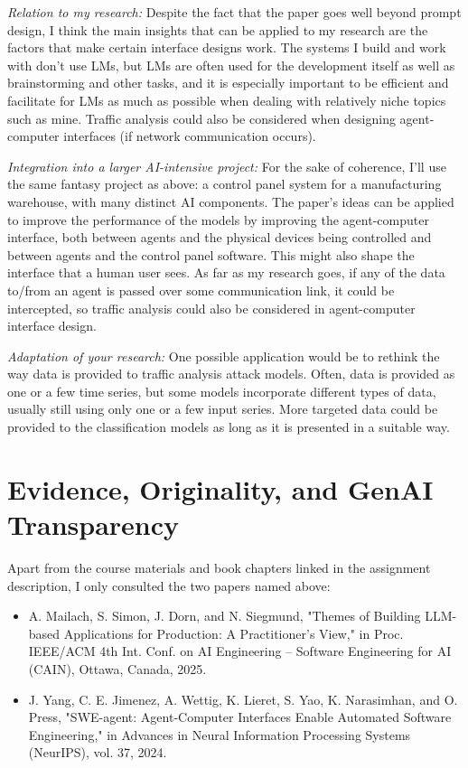 \documentclass[11pt]{article}
\begin{document}
\textit{Relation to my research:} Despite the fact that the paper goes well beyond prompt design, I think the main insights that can be applied to my research are the factors that make certain interface designs work. The systems I build and work with don't use LMs, but LMs are often used for the development itself as well as brainstorming and other tasks, and it is especially important to be efficient and facilitate for LMs as much as possible when dealing with relatively niche topics such as mine. Traffic analysis could also be considered when designing agent-computer interfaces (if network communication occurs).

\textit{Integration into a larger AI-intensive project:} For the sake of coherence, I'll use the same fantasy project as above: a control panel system for a manufacturing warehouse, with many distinct AI components. The paper's ideas can be applied to improve the performance of the models by improving the agent-computer interface, both between agents and the physical devices being controlled and between agents and the control panel software. This might also shape the interface that a human user sees. As far as my research goes, if any of the data to/from an agent is passed over some communication link, it could be intercepted, so traffic analysis could also be considered in agent-computer interface design.

\textit{Adaptation of your research:} One possible application would be to rethink the way data is provided to traffic analysis attack models. Often, data is provided as one or a few time series, but some models incorporate different types of data, usually still using only one or a few input series. More targeted data could be provided to the classification models as long as it is presented in a suitable way.

\section{Evidence, Originality, and GenAI Transparency}

Apart from the course materials and book chapters linked in the assignment description, I only consulted the two papers named above:

\begin{itemize}
    \item A. Mailach, S. Simon, J. Dorn, and N. Siegmund, "Themes of Building LLM-based Applications for Production: A Practitioner's View," in Proc. IEEE/ACM 4th Int. Conf. on AI Engineering – Software Engineering for AI (CAIN), Ottawa, Canada, 2025.
    \item J. Yang, C. E. Jimenez, A. Wettig, K. Lieret, S. Yao, K. Narasimhan, and O. Press, "SWE-agent: Agent-Computer Interfaces Enable Automated Software Engineering," in Advances in Neural Information Processing Systems (NeurIPS), vol. 37, 2024.
\end{itemize}
\end{document}
